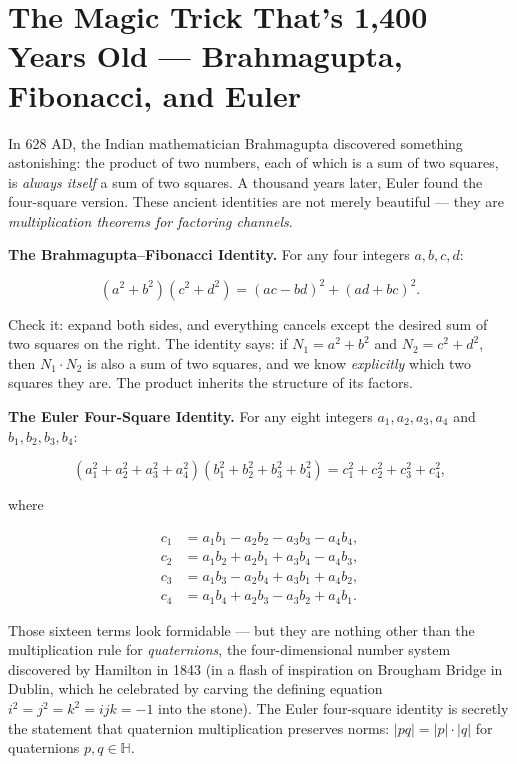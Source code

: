 \ornbreak



\section{The Magic Trick That's 1,400 Years Old --- Brahmagupta, Fibonacci, and Euler}


In 628 AD, the Indian mathematician Brahmagupta discovered something astonishing: the product of two numbers, each of which is a sum of two squares, is \textit{always itself} a sum of two squares. A thousand years later, Euler found the four-square version. These ancient identities are not merely beautiful --- they are \textit{multiplication theorems for factoring channels}.

\textbf{The Brahmagupta–Fibonacci Identity.} For any four integers $a, b, c, d$:

\[
(a^2 + b^2)(c^2 + d^2) = (ac - bd)^2 + (ad + bc)^2.
\]

Check it: expand both sides, and everything cancels except the desired sum of two squares on the right. The identity says: if $N_1 = a^2 + b^2$ and $N_2 = c^2 + d^2$, then $N_1 \cdot N_2$ is also a sum of two squares, and we know \textit{explicitly} which two squares they are. The product inherits the structure of its factors.

\textbf{The Euler Four-Square Identity.} For any eight integers $a_1, a_2, a_3, a_4$ and $b_1, b_2, b_3, b_4$:

\[
(a_1^2 + a_2^2 + a_3^2 + a_4^2)(b_1^2 + b_2^2 + b_3^2 + b_4^2) = c_1^2 + c_2^2 + c_3^2 + c_4^2,
\]

where

$$\begin{aligned}
c_1 &= a_1 b_1 - a_2 b_2 - a_3 b_3 - a_4 b_4, \\
c_2 &= a_1 b_2 + a_2 b_1 + a_3 b_4 - a_4 b_3, \\
c_3 &= a_1 b_3 - a_2 b_4 + a_3 b_1 + a_4 b_2, \\
c_4 &= a_1 b_4 + a_2 b_3 - a_3 b_2 + a_4 b_1.
\end{aligned}$$

Those sixteen terms look formidable --- but they are nothing other than the multiplication rule for \textit{quaternions}, the four-dimensional number system discovered by Hamilton in 1843 (in a flash of inspiration on Brougham Bridge in Dublin, which he celebrated by carving the defining equation $i^2 = j^2 = k^2 = ijk = -1$ into the stone). The Euler four-square identity is secretly the statement that quaternion multiplication preserves norms: $|pq| = |p| \cdot |q|$ for quaternions $p, q \in \mathbb{H}$.

